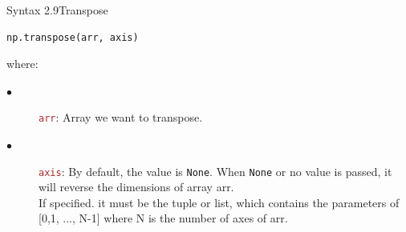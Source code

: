 \documentclass{book}
\begin{document}
\begin{synBox}{Syntax 2.9}{Transpose}
    \begin{lstlisting}[language=Python, basicstyle=\ttfamily\small, keywordstyle=\color{blue}, commentstyle=\color{forestgreen}, stringstyle=\color{red}, showstringspaces=false]
                    np.transpose(arr, axis)
    \end{lstlisting}
    \raggedright
    where:\\
    \begin{description}
        \item[$\bullet$] \textcolor{brown}{\texttt{arr}}: Array we want to transpose.
        \item[$\bullet$] \textcolor{brown}{\texttt{axis}}: By default, the value is \texttt{None}. When \texttt{None} or no value is passed, it will reverse the dimensions of array arr.\\
        If specified. it must be the tuple or list, which contains the parameters of [0,1, ..., N-1] where N is the number of axes of arr.
    \end{description}
\end{synBox}
\end{document}
